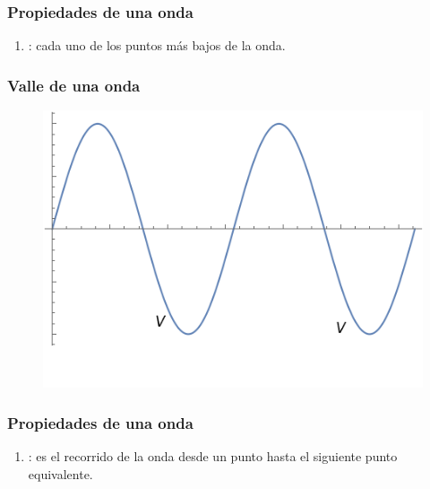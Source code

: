 \documentclass[14pt]{beamer}
\begin{document}
\begin{frame}
\frametitle{Propiedades de una onda}
\begin{enumerate}[<+->]
\conti
\item {}: cada uno de los puntos más bajos de la onda.
\seti
\end{enumerate}
\end{frame}
\begin{frame}
\frametitle{Valle de una onda}
\begin{figure}
    \centering
    \includegraphics[scale=0.8]{Imagenes/Plot_Onda_05.png}
\end{figure}
\end{frame}
\begin{frame}
\frametitle{Propiedades de una onda}
\begin{enumerate}[<+->]
\conti
\item {}: es el recorrido de la onda desde un punto hasta el siguiente punto equivalente.
\seti
\end{enumerate}
\end{frame}
\end{document}
